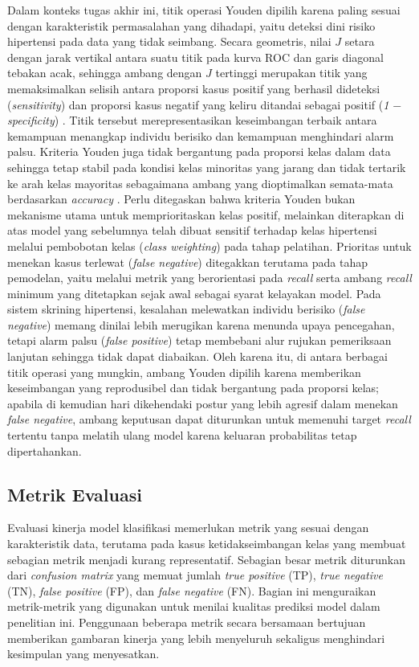 Dalam konteks tugas akhir ini, titik operasi Youden dipilih karena paling sesuai dengan karakteristik permasalahan yang dihadapi, yaitu deteksi dini risiko hipertensi pada data yang tidak seimbang. Secara geometris, nilai $J$ setara dengan jarak vertikal antara suatu titik pada kurva ROC dan garis diagonal tebakan acak, sehingga ambang dengan $J$ tertinggi merupakan titik yang memaksimalkan selisih antara proporsi kasus positif yang berhasil dideteksi (\emph{sensitivity}) dan proporsi kasus negatif yang keliru ditandai sebagai positif (\emph{1 $-$ specificity}) \autocite{Habibzadeh2016Cutoff}. Titik tersebut merepresentasikan keseimbangan terbaik antara kemampuan menangkap individu berisiko dan kemampuan menghindari alarm palsu. Kriteria Youden juga tidak bergantung pada proporsi kelas dalam data sehingga tetap stabil pada kondisi kelas minoritas yang jarang dan tidak tertarik ke arah kelas mayoritas sebagaimana ambang yang dioptimalkan semata-mata berdasarkan \emph{accuracy} \autocite{Perkins2006Youden}. Perlu ditegaskan bahwa kriteria Youden bukan mekanisme utama untuk memprioritaskan kelas positif, melainkan diterapkan di atas model yang sebelumnya telah dibuat sensitif terhadap kelas hipertensi melalui pembobotan kelas (\emph{class weighting}) pada tahap pelatihan. Prioritas untuk menekan kasus terlewat (\emph{false negative}) ditegakkan terutama pada tahap pemodelan, yaitu melalui metrik yang berorientasi pada \emph{recall} serta ambang \emph{recall} minimum yang ditetapkan sejak awal sebagai syarat kelayakan model. Pada sistem skrining hipertensi, kesalahan melewatkan individu berisiko (\emph{false negative}) memang dinilai lebih merugikan karena menunda upaya pencegahan, tetapi alarm palsu (\emph{false positive}) tetap membebani alur rujukan pemeriksaan lanjutan sehingga tidak dapat diabaikan. Oleh karena itu, di antara berbagai titik operasi yang mungkin, ambang Youden dipilih karena memberikan keseimbangan yang reprodusibel dan tidak bergantung pada proporsi kelas; apabila di kemudian hari dikehendaki postur yang lebih agresif dalam menekan \emph{false negative}, ambang keputusan dapat diturunkan untuk memenuhi target \emph{recall} tertentu tanpa melatih ulang model karena keluaran probabilitas tetap dipertahankan.

\subsection{Metrik Evaluasi}
Evaluasi kinerja model klasifikasi memerlukan metrik yang sesuai dengan karakteristik data, terutama pada kasus ketidakseimbangan kelas yang membuat sebagian metrik menjadi kurang representatif. Sebagian besar metrik diturunkan dari \emph{confusion matrix} yang memuat jumlah \emph{true positive} (TP), \emph{true negative} (TN), \emph{false positive} (FP), dan \emph{false negative} (FN). Bagian ini menguraikan metrik-metrik yang digunakan untuk menilai kualitas prediksi model dalam penelitian ini. Penggunaan beberapa metrik secara bersamaan bertujuan memberikan gambaran kinerja yang lebih menyeluruh sekaligus menghindari kesimpulan yang menyesatkan.

